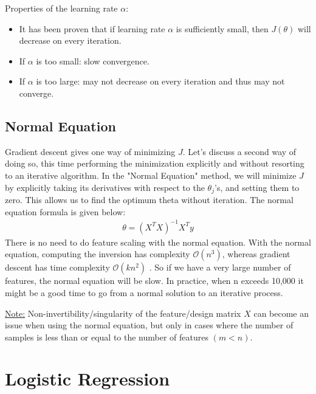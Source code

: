 \documentclass{article}
\begin{document}
            Properties of the learning rate $\alpha$:
            \begin{itemize}
                \item It has been proven that if learning rate $\alpha$ is sufficiently small, then $J(\theta)$ will decrease on every iteration.
                \item If $\alpha$ is too small: slow convergence.
                \item If $\alpha$ is too large: may not decrease on every iteration and thus may not converge.
            \end{itemize}

        \subsection{Normal Equation}

            Gradient descent gives one way of minimizing $J$. Let’s discuss a second way of doing so, this time performing the minimization explicitly and
            without resorting to an iterative algorithm. In the "Normal Equation" method, we will minimize $J$ by explicitly taking its derivatives with 
            respect to the $\theta_j$’s, and setting them to zero. This allows us to find the optimum theta without iteration. The normal equation formula is given below:
            \begin{align*}
                \theta = (X^TX)^{-1}X^Ty
            \end{align*}
            There is no need to do feature scaling with the normal equation. With the normal equation, computing the inversion has complexity 
            $\mathcal{O}(n^3)$, whereas gradient descent has time complexity $\mathcal{O}(kn^2)$ . So if we have a very large number of features, the normal equation will be slow. In practice, when n exceeds 
            10,000 it might be a good time to go from a normal solution to an iterative process.
            \par
            \underline{Note:} Non-invertibility/singularity of the feature/design matrix $X$ can become an issue when using the 
            normal equation, but only in cases where the number of samples is less than or equal to the number of features $(m < n)$. 
    
    \section{Logistic Regression}
\end{document}
